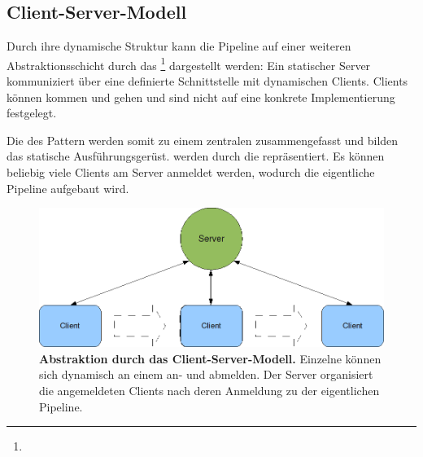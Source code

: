 \subsection{Client-Server-Modell}
Durch ihre dynamische Struktur kann die Pipeline auf einer weiteren
Abstraktionsschicht durch das 
\footnote{
}
dargestellt werden:
Ein statischer Server kommuniziert über eine definierte Schnittstelle mit
dynamischen Clients.
Clients können kommen und gehen und sind nicht auf eine konkrete
Implementierung festgelegt. 

Die  des  Pattern werden somit zu einem
zentralen  zusammengefasst und bilden das statische
Ausführungsgerüst.
 werden durch die  repräsentiert.  Es können beliebig viele Clients am Server anmeldet werden, wodurch
die eigentliche Pipeline aufgebaut wird.

\begin{figure}[htbp]
	\begin{center}
		\includegraphics[scale=0.6]{pics/serverClient2.png}
	\caption[Client-Server-Modell]{
	\textbf{Abstraktion durch das Client-Server-Modell.}
	Einzelne  können sich
	dynamisch an einem  an- und abmelden. Der Server organisiert die
	angemeldeten Clients nach deren Anmeldung zu der eigentlichen Pipeline.}
	\end{center}
	\label{fig:clientServer2}
\end{figure}

